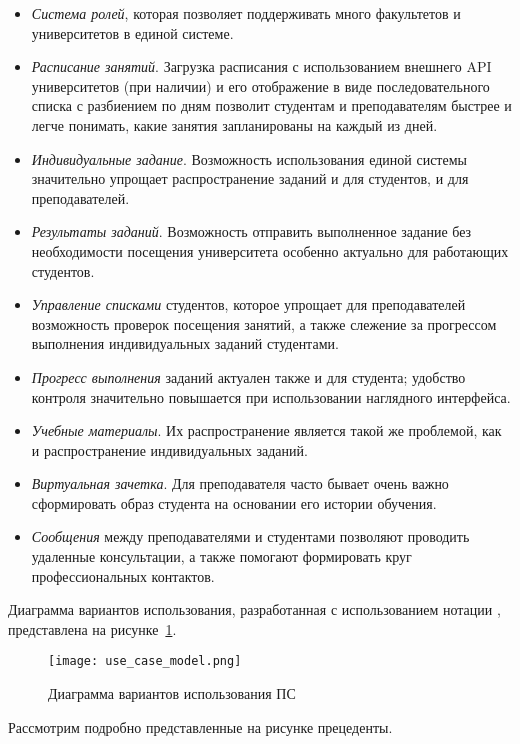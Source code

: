 \begin{itemize}
	\item \emph{Система ролей}, которая позволяет поддерживать много факультетов и университетов в единой системе.
	\item \emph{Расписание занятий}. Загрузка расписания с использованием внешнего API университетов (при наличии) и его отображение в виде последовательного списка с разбиением по дням позволит студентам и преподавателям быстрее и легче понимать, какие занятия запланированы на каждый из дней.
	\item \emph{Индивидуальные задание}. Возможность использования единой системы значительно упрощает распространение заданий и для студентов, и для преподавателей.
	\item \emph{Результаты заданий}. Возможность отправить выполненное задание без необходимости посещения университета особенно актуально для работающих студентов.
	\item \emph{Управление списками} студентов, которое упрощает для преподавателей возможность проверок посещения занятий, а также слежение за прогрессом выполнения индивидуальных заданий студентами.
	\item \emph{Прогресс выполнения} заданий актуален также и для студента; удобство контроля значительно повышается при использовании наглядного интерфейса.
	\item \emph{Учебные материалы}. Их распространение является такой же проблемой, как и распространение индивидуальных заданий.
	\item \emph{Виртуальная зачетка}. Для преподавателя часто бывает очень важно сформировать образ студента на основании его истории обучения.
	\item \emph{Сообщения} между преподавателями и студентами позволяют проводить удаленные консультации, а также помогают формировать круг профессиональных контактов.
\end{itemize}

Диаграмма вариантов использования, разработанная с использованием нотации \uml, представлена на рисунке~\ref{fig:domain:model:use_cases:model}.

\begin{figure}
\centering
	\texttt{[image: use\_case\_model.png]}
	\caption{Диаграмма вариантов использования ПС}
	\label{fig:domain:model:use_cases:model}
\end{figure}

Рассмотрим подробно представленные на рисунке прецеденты.


